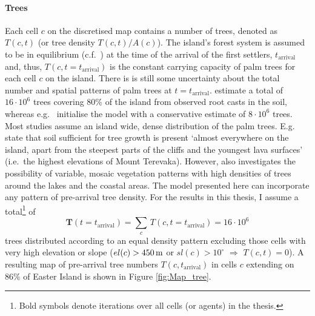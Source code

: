 \paragraph{Trees}
Each cell $c$ on the discretised map contains a number of trees, denoted as $T(c,t)$ (or tree density $T(c,t)/A(c)$).
The island's forest system is assumed to be in equilibrium (c.f.\ \citet{Brander1998}) at the time of the arrival of the first settlers, $t_\text{arrival}$ and, thus, $T(c,t=t_\text{arrival})$ is the constant carrying capacity of palm trees for each cell $c$ on the island. 
There is is still some uncertainty about the total number and spatial patterns of palm trees at $t=t_\text{arrival}$.
\citet{Mieth2015} estimate a total of $16\cdot 10^6$ trees covering $80\%$ of the island from observed root casts in the soil, whereas e.g.\ \citet{Brandt2015} initialise the model with a conservative estimate of $8\cdot 10^6$ trees. 
Most studies assume an island wide, dense distribution of the palm trees. 
E.g.\ \citet{Bahn2017} state that soil sufficient for tree growth is present `almost everywhere on the island, apart from the steepest parts of the cliffs and the youngest lava surfaces' (i.e.\ the highest elevations of Mount Terevaka). 
However, \citet{Rull2020} also investigates the possibility of variable, mosaic vegetation patterns with high densities of trees around the lakes and the coastal areas.
The model presented here can incorporate any pattern of pre-arrival tree density. 
For the results in this thesis, I assume 
a total\footnote{Bold symbols denote iterations over all cells (or agents) in the thesis.} of 
\begin{equation}
\mathbf{T}(t=t_\text{arrival}) = \sum_{c} \, T(c,t=t_\text{arrival}) =  16 \cdot 10^6
\end{equation} 
trees distributed according to an equal density pattern excluding those cells with very high elevation or slope ($el(c)>450\, {\rm m}$ or $sl(c)>10^\circ$ $\Rightarrow$ $T(c,t) = 0$).
A resulting map of pre-arrival tree numbers $T(c,t_\text{arrival})$ in cells $c$ extending on $86\%$ of Easter Island is shown in Figure \ref{fig:Map_tree}.

